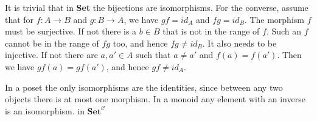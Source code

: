 It is trivial that in \textbf{Set} the bijections are isomorphisms. For the converse, assume that for $f:A\to B$ and $g:B\to A$, we have $gf=id_A$ and $fg=id_B$. The morphism $f$ must be surjective. If not there is a $b\in B$ that is not in the range of $f$. Such an $f$ cannot be in the range of $fg$ too, and hence $fg\neq id_B$. It also needs to be injective. If not there are $a,a'\in A$ such that $a\neq a'$ and $f(a)=f(a')$. Then we have $gf(a)=gf(a')$, and hence $gf\neq id_A$.

In a poset the only isomorphisms are the identities, since between any two objects there is at most one morphism. In a monoid any element with an inverse is an isomorphism. in $\textbf{Set}^\mathcal{C}$
